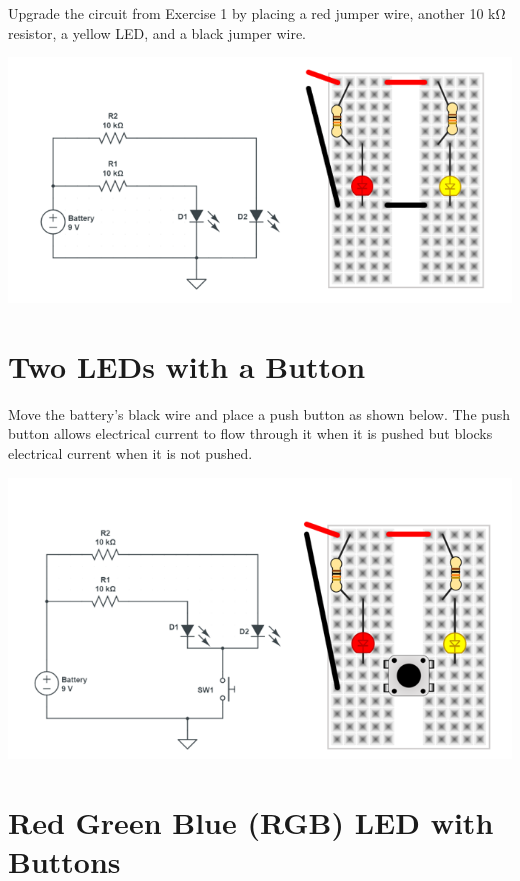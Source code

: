 \documentclass[
]{book}
\begin{document}
Upgrade the circuit from Exercise 1 by placing a red jumper wire, another 10 kΩ resistor, a yellow LED, and a black jumper wire.

\includegraphics[width=9.74in]{images/two_led_diagram}

\hypertarget{two-leds-with-a-button}{%
\chapter{Two LEDs with a Button}\label{two-leds-with-a-button}}

Move the battery's black wire and place a push button as shown below. The push button allows electrical current to flow through it when it is pushed but blocks electrical current when it is not pushed.

\includegraphics[width=9.46in]{images/two_led_with_button_diagram}

\hypertarget{red-green-blue-rgb-led-with-buttons}{%
\chapter{Red Green Blue (RGB) LED with Buttons}\label{red-green-blue-rgb-led-with-buttons}}
\end{document}
